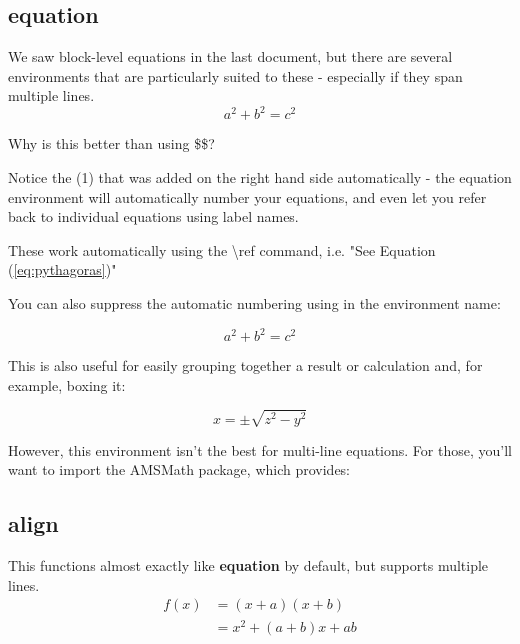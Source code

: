 \documentclass{article}
\begin{document}
    \subsection{equation}
        We saw block-level equations in the last document, but there are several environments that are particularly suited to these - especially if they span multiple lines.
        \begin{equation}
            a^2 + b^2 = c^2
            \label{eq:pythagoras} %
        \end{equation}
        
        Why is this better than using \$\$?
        
        Notice the (1) that was added on the right hand side automatically - the equation environment will automatically number your equations, and even let you refer back to individual equations using label names. 
        
        These work automatically using the \textbackslash ref command, i.e. "See Equation (\ref{eq:pythagoras})"

        \newpage

        You can also suppress the automatic numbering using \* in the environment name:
        
        \begin{equation*}
            a^2 + b^2 = c^2
            \label{eq:pythagoras2}
        \end{equation*}
        
        This is also useful for easily grouping together a result or calculation and, for example, boxing it:
        
        \begin{equation}
         \boxed{x = \pm \sqrt{z^2 - y^2}}
        \end{equation}
        
        However, this environment isn't the best for multi-line equations. For those, you'll want to import the AMSMath package, which provides:

    \subsection{align}
        This functions almost exactly like \textbf{equation} by default, but supports multiple lines.
        \begin{align}
         f(x) &= (x+a)(x+b) \\
              &= x^2 + (a+b)x + ab
        \end{align}
        
\end{document}

